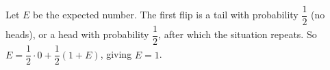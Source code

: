 Let $E$ be the expected number. The first flip is a tail with probability $\dfrac{1}{2}$ (no heads), or a head with probability $\dfrac{1}{2}$, after which the situation repeats. So $E=\dfrac{1}{2}\cdot0+\dfrac{1}{2}(1+E)$, giving $E=\boxed{1}$.
